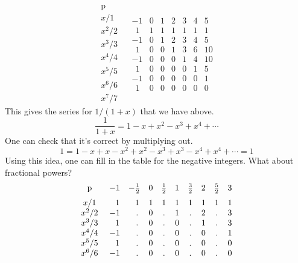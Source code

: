 \documentclass[11pt, oneside]{article}
\begin{document}
\[
\begin{matrix}
\text{p}  \\
x/1  \\
x^2/2 \\
x^3/3 \\
x^4/4 \\
x^5/5 \\
x^6/6 \\
x^7/7
\end{matrix} \ \ \ \
\begin{matrix}
-1 & 0 & 1 & 2 & 3 & 4 & 5  \\
\ \ 1 & 1 & 1 & 1 & 1 & 1 & 1  \\
-1 & 0 & 1 & 2 & 3 & 4 & 5 \\
\ \ 1 & 0 & 0 & 1 & 3 & 6 & 10 \\
-1 & 0 & 0 & 0 & 1 & 4 & 10 \\
\ \ 1 & 0 & 0 & 0 & 0 & 1 & 5 \\
-1 & 0 & 0 & 0 & 0 & 0 & 1 \\
\ \ 1 & 0 & 0 & 0 & 0 & 0 & 0
\end{matrix}
\]
This gives the series for $1/(1+x)$ that we have above.  
\[ \frac{1}{1+x} = 1 - x + x^2 - x^3 + x^4 + \cdots  \]
One can check that it's correct by multiplying out.
\[ 1 = 1 - x + x - x^2 + x^2 - x^3 + x^3 - x^4 + x^4 + \cdots  = 1 \]
Using this idea, one can fill in the table for the negative integers.  What about fractional powers?
\[
\begin{matrix}
\text{p}  \vspace{2 mm} \\
x/1  \\
x^2/2 \\
x^3/3 \\
x^4/4 \\
x^5/5 \\
x^6/6
\end{matrix} \ \ \ \
\begin{matrix}
-1 & -\frac{1}{2} & 0& \frac{1}{2} & 1& \frac{3}{2}  & 2 & \frac{5}{2}  & 3   \vspace{2 mm}  \\
\ \ 1 & \ \ 1 & 1 & 1 & 1 & 1 & 1 & 1 & 1 \\
-1 & \ \ . & 0 & . & 1 & . & 2 & . & 3 \\
\ \ 1 & \ \ . & 0 & . & 0 & . & 1 & . & 3 \\
-1 &  \ \ .  & 0 & . & 0 & . & 0 & . & 1 \\
\ \ 1 &  \ \ . & 0 & . & 0 & . & 0 & . & 0 \\
-1 &   \ \  . & 0 & . & 0 & . & 0 & . & 0 \\
\end{matrix}
\]
\end{document}
